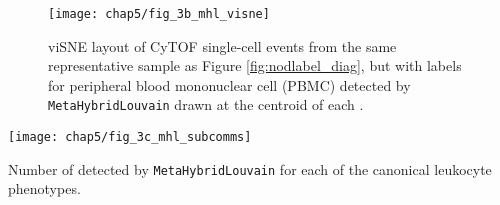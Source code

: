 \begin{figure}[htb]
  \centering
  \texttt{[image: chap5/fig\_3b\_mhl\_visne]}
  \caption[viSNE layout of \texttt{MetaHybridLouvain} \subcommunities{}]{viSNE layout of CyTOF single-cell events from the same representative sample as Figure \ref{fig:nodlabel_diag}, but with labels for peripheral blood mononuclear cell (PBMC) \subcommunities{} detected by \texttt{MetaHybridLouvain} drawn at the centroid of each \subcommunity{}.
  }
  \label{fig:mhl_visne}
\end{figure}
\begin{marginfigure}
  \centering
  \texttt{[image: chap5/fig\_3c\_mhl\_subcomms]}
  \caption[Number of \subcommunities{} detected by \texttt{MetaHybridLouvain} per canonical phenotype]{Number of \subcommunities{} detected by \texttt{MetaHybridLouvain} for each of the canonical leukocyte phenotypes.}
  \label{fig:mhl_subcomms}
\end{marginfigure}

